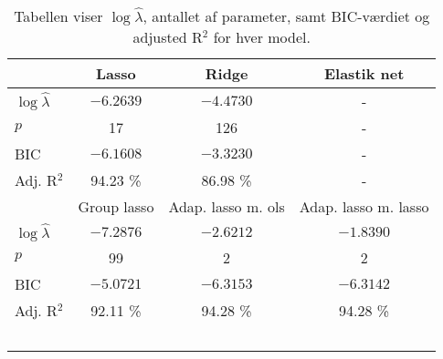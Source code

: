 \begin{table}
\center
\begin{tabular}{lccc} 
\toprule
& \multicolumn{1}{c}{Lasso} & \multicolumn{1}{c}{Ridge} & \multicolumn{1}{c}{Elastik net} \\ \midrule
$\log \widehat{\lambda}$ & $-6.2639$ & $-4.4730$ & -\\
$p$ & 17 & 126 & - \\
BIC & $-6.1608 $& $-3.3230$& - \\
Adj. R$^2$ & 94.23 \% & 86.98  \%  & -  \\ \bottomrule \toprule
& Group lasso & Adap. lasso m. ols & Adap. lasso m. lasso \\ \midrule
$\log \widehat{\lambda}$ & $-7.2876$&  $-2.6212$& $-1.8390$ \\
$p$ &99 & 2&2 \\
BIC & $-5.0721$& $-6.3153$&$-6.3142$ \\
Adj. R$^2$ & 92.11 \% & 94.28 \% &  94.28 \% \\ \bottomrule \
 \end{tabular}
\caption{Tabellen viser ${\log \widehat\lambda}$, antallet af parameter, samt BIC-værdiet og adjusted R$^2$ for hver model.} \label{tab:bic_lambda}
\end{table}
